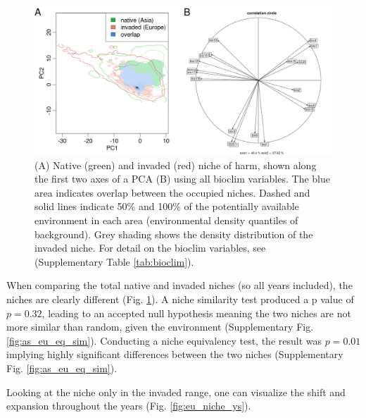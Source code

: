 \documentclass[12pt,a4paper]{article}
\begin{document}
\begin{figure}
    \centering
    \includegraphics[width = 1\linewidth]{"../../R/figures/as-eu-tot-niche-w-pca.png"}
    \caption{\label{fig:as_eu_niche_w_pca} (A) Native (green) and invaded (red) niche of \gls{harm}, shown along the first two axes of a PCA (B) using all bioclim variables. The blue area indicates overlap between the occupied niches. Dashed and solid lines indicate 50\% and 100\% of the potentially available environment in each area (environmental density quantiles of background). Grey shading shows the density distribution of the invaded niche. For detail on the bioclim variables, see (Supplementary Table \ref{tab:bioclim}).}
\end{figure}

When comparing the total native and invaded niches (so all years included), the niches are clearly different (Fig. \ref{fig:as_eu_niche_w_pca}).
A niche similarity test produced a p value of $p = 0.32$, leading to an accepted null hypothesis meaning the two niches are not more similar than random, given the environment (Supplementary Fig. \ref{fig:as_eu_eq_sim}).
Conducting a niche equivalency test, the result was $p = 0.01$ implying highly significant differences between the two niches (Supplementary Fig. \ref{fig:as_eu_eq_sim}).

Looking at the niche only in the invaded range, one can visualize the shift and expansion throughout the years (Fig. \ref{fig:eu_niche_ys}).
\end{document}
